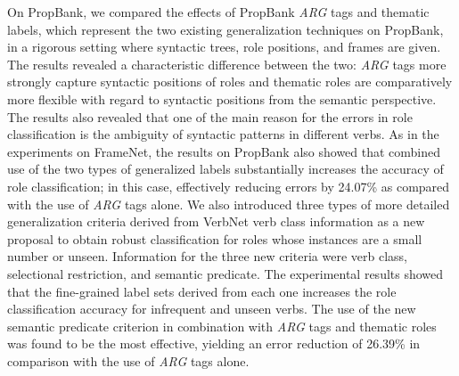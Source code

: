 \documentclass[english]{jnlp_1.4_rep}
\begin{document}
On PropBank, we compared the effects of PropBank {\it ARG} tags and thematic labels, which represent the two existing generalization techniques on PropBank, in a rigorous setting where syntactic trees, role positions, and frames are given. The results revealed a characteristic difference between the two: {\it ARG} tags more strongly capture syntactic positions of roles and thematic roles are comparatively more flexible with regard to syntactic positions from the semantic perspective. The results also revealed that one of the main reason for the errors in role classification is the ambiguity of syntactic patterns in different verbs.
As in the experiments on FrameNet, the results on PropBank also showed that combined use of the two types of generalized labels substantially increases the accuracy of role classification; in this case, effectively reducing errors by 24.07\% as compared with the use of {\it ARG} tags alone.
We also introduced three types of more detailed generalization criteria derived from VerbNet verb class information as a new proposal to obtain robust classification for roles whose instances are a small number or unseen. Information for the three new criteria were verb class, selectional restriction, and semantic predicate. The experimental results showed that the fine-grained label sets derived from each one increases the role classification accuracy for infrequent and unseen verbs. The use of the new semantic predicate criterion in combination with {\it ARG} tags and thematic roles was found to be the most effective, yielding an error reduction of 26.39\% in comparison with the use of {\it ARG} tags alone.
\end{document}
